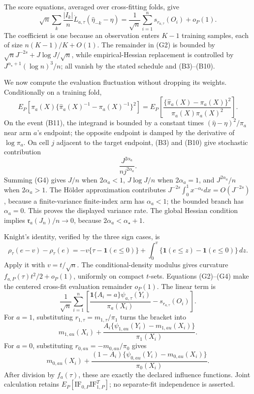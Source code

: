 The score equations, averaged over cross-fitting folds, give
\[
 \sqrt n\sum_k\frac{|I_k|}{n}\dot L_{a,\tau}(\widehat\eta_{-k}-\eta)
 =\frac1{\sqrt n}\sum_{i=1}^ns_{r_{a,\tau}}(O_i)+o_P(1).
\tag{G2}
\]
The coefficient is one because an observation enters \(K-1\) training samples, each of size \(n(K-1)/K+O(1)\).  The remainder in (G2) is bounded by \(\sqrt nJ^{-2s}+J\log J/\sqrt n\), while empirical-Hessian replacement is controlled by \(J^{\alpha_\star+1}(\log n)^3/n\); all vanish by the stated schedule and (B3)--(B10).

We now compute the evaluation fluctuation without dropping its weights.  Conditionally on a training fold,
\[
 E_P\!\left[\pi_a(X)\{\widehat\pi_a(X)^{-1}-\pi_a(X)^{-1}\}^2\right]
 =E_P\!\left[\frac{\{\widehat\pi_a(X)-\pi_a(X)\}^2}
 {\pi_a(X)\widehat\pi_a(X)^2}\right].
\tag{G3}
\]
On the event (B11), the integrand is bounded by a constant times \((\widehat\eta-\eta)^2/\pi_a\) near arm \(a\)'s endpoint; the opposite endpoint is damped by the derivative of \(\log\pi_a\).  On cell \(j\) adjacent to the target endpoint, (B3) and (B10) give stochastic contribution
\[
 \frac{J^{2\alpha_a}}{n j^{2\alpha_a}}.
\tag{G4}
\]
Summing (G4) gives \(J/n\) when \(2\alpha_a<1\), \(J\log J/n\) when \(2\alpha_a=1\), and \(J^{2\alpha_a}/n\) when \(2\alpha_a>1\).  The Hölder approximation contributes \(J^{-2s}\int_0^1x^{-\alpha_a}dx=O(J^{-2s})\), because a finite-variance finite-index arm has \(\alpha_a<1\); the bounded branch has \(\alpha_a=0\).  This proves the displayed variance rate.  The global Hessian condition implies \(\mathfrak r_a(J_n)/n\to0\), because \(2\alpha_a<\alpha_\star+1\).

Knight's identity, verified by the three sign cases, is
\[
 \rho_\tau(e-v)-\rho_\tau(e)
 =-v\{\tau-\mathbf1(e\le0)\}
 +\int_0^v\{\mathbf1(e\le z)-\mathbf1(e\le0)\}\,dz.
\tag{G5}
\]
Apply it with \(v=t/\sqrt n\).  The conditional-density modulus gives curvature \(f_{a,P}(\tau)t^2/2+o_P(1)\), uniformly on compact \(t\)-sets.  Equations (G2)--(G4) make the centered cross-fit evaluation remainder \(o_P(1)\).  The linear term is
\[
 \frac1{\sqrt n}\sum_{i=1}^n
 \left[\frac{\mathbf1\{A_i=a\}\psi_{a,\tau}(Y_i)}{\pi_a(X_i)}
 -s_{r_{a,\tau}}(O_i)\right].
\tag{G6}
\]
For \(a=1\), substituting \(r_{1,\tau}=m_{1,\tau}/\pi_1\) turns the bracket into
\[
 m_{1,	au}(X_i)+\frac{A_i\{\psi_{1,	au}(Y_i)-m_{1,	au}(X_i)\}}{\pi_1(X_i)}.
\]
For \(a=0\), substituting \(r_{0,	au}=-m_{0,	au}/\pi_0\) gives
\[
 m_{0,	au}(X_i)+\frac{(1-A_i)\{\psi_{0,	au}(Y_i)-m_{0,	au}(X_i)\}}{\pi_0(X_i)}.
\]
After division by \(f_a(\tau)\), these are exactly the declared influence functions.  Joint calculation retains \(E_P[\mathrm{IF}_{0,P}\mathrm{IF}_{1,P}^T]\); no separate-fit independence is asserted.

